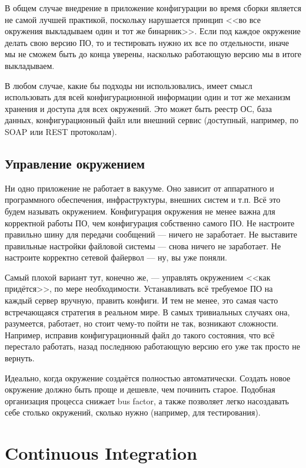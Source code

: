 \documentclass{../../text-style}
\begin{document}
В общем случае внедрение в приложение конфигурации во время сборки является не самой лучшей практикой, поскольку нарушается принцип <<во все окружения выкладываем один и тот же бинарник>>. Если под каждое окружение делать свою версию ПО, то и тестировать нужно их все по отдельности, иначе мы не сможем быть до конца уверены, насколько работающую версию мы в итоге выкладываем.

В любом случае, какие бы подходы ни использовались, имеет смысл использовать для всей конфигурационной информации один и тот же механизм хранения и доступа для всех окружений. Это может быть реестр ОС, база данных, конфигурационный файл или внешний сервис (доступный, например, по SOAP или REST протоколам).

\subsection{Управление окружением}

Ни одно приложение не работает в вакууме. Оно зависит от аппаратного и программного обеспечения, инфраструктуры, внешних систем и т.п. Всё это будем называть окружением. Конфигурация окружения не менее важна для корректной работы ПО, чем конфигурация собственно самого ПО. Не настроите правильно шину для передачи сообщений --- ничего не заработает. Не выставите правильные настройки файловой системы --- снова ничего не заработает. Не настроите корректно сетевой файервол --- ну, вы уже поняли.

Самый плохой вариант тут, конечно же, --- управлять окружением <<как придётся>>, по мере необходимости. Устанавливать всё требуемое ПО на каждый сервер вручную, править конфиги. И тем не менее, это самая часто встречающаяся стратегия в реальном мире. В самых тривиальных случаях она, разумеется, работает, но стоит чему-то пойти не так, возникают сложности. Например, исправив конфигурационный файл до такого состояния, что всё перестало работать, назад последнюю работающую версию его уже так просто не вернуть.

Идеально, когда окружение создаётся полностью автоматически. Создать новое окружение должно быть проще и дешевле, чем починить старое. Подобная организация процесса снижает bus factor, а также позволяет легко насоздавать себе столько окружений, сколько нужно (например, для тестирования).

\section{Continuous Integration}
\end{document}
